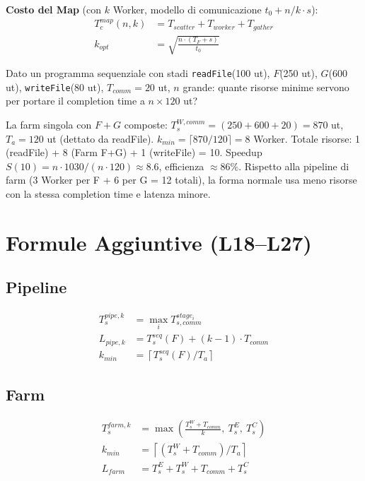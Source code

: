 \documentclass[11pt,a4paper]{article}
\theoremstyle{remark}
\newenvironment{esercizio}[1][]{%
  \begin{tcolorbox}[breakable,title={\textbf{Esercizio / Domanda d'esame}\ifx&#1&\else: #1\fi},
    colback=yellow!5!white, colframe=orange!75!black, fonttitle=\small\bfseries]%
}{%
  \end{tcolorbox}%
}
\newenvironment{risposta}{%
  \begin{tcolorbox}[breakable,title={\textbf{Risposta}},
    colback=green!5!white, colframe=green!50!black, fonttitle=\small\bfseries]%
}{%
  \end{tcolorbox}%
}
\begin{document}
\textbf{Costo del Map} (con $k$ Worker, modello di comunicazione $t_0 + n/k \cdot s$):
\begin{align*}
T_c^{map}(n,k) &= T_{scatter} + T_{worker} + T_{gather} \\
k_{opt} &= \sqrt{\frac{n \cdot (T_F + s)}{t_0}}
\end{align*}

\begin{esercizio}
Dato un programma sequenziale con stadi \texttt{readFile}(100 ut), $F$(250 ut), $G$(600 ut), \texttt{writeFile}(80 ut), $T_{comm}=20$ ut, $n$ grande: quante risorse minime servono per portare il completion time a $n \times 120$ ut?
\end{esercizio}
\begin{risposta}
La farm singola con $F+G$ composte: $T_s^{W,comm} = (250+600+20) = 870$ ut, $T_a = 120$ ut (dettato da readFile). $k_{min} = \lceil 870/120 \rceil = 8$ Worker. Totale risorse: 1 (readFile) + 8 (Farm F+G) + 1 (writeFile) = 10. Speedup $S(10) = n\cdot 1030 / (n\cdot 120) \approx 8.6$, efficienza $\approx 86\%$. Rispetto alla pipeline di farm (3 Worker per F + 6 per G = 12 totali), la forma normale usa meno risorse con la stessa completion time e latenza minore.
\end{risposta}

\section*{Formule Aggiuntive (L18--L27)}

\subsection{Pipeline}
\begin{align*}
T_s^{pipe,k} &= \max_i T_{s,comm}^{stage_i} \\
L_{pipe,k} &= T_s^{seq}(F) + (k-1) \cdot T_{comm} \\
k_{min} &= \left\lceil T_s^{seq}(F) / T_a \right\rceil
\end{align*}

\subsection{Farm}
\begin{align*}
T_s^{farm,k} &= \max\!\left(\frac{T_s^W + T_{comm}}{k},\ T_s^E,\ T_s^C\right) \\
k_{min} &= \left\lceil (T_s^W + T_{comm}) / T_a \right\rceil \\
L_{farm} &= T_s^E + T_s^W + T_{comm} + T_s^C
\end{align*}
\end{document}
